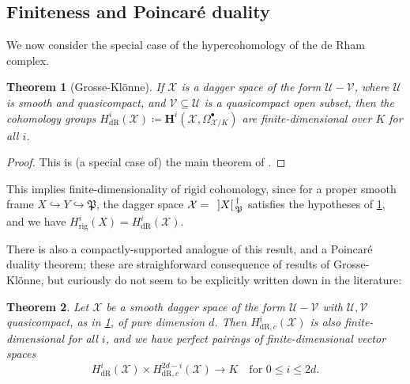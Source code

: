 \documentclass[cjm]{ipart}
\theoremstyle{plain}
\newtheorem{theorem}{Theorem}[subsection]
\theoremstyle{remark}
\DeclarePairedDelimiter{\tb}{{\,]}}{{[\, }} %
\newcommand{\HH}{\mathbf{H}}
\newcommand{\cU}{\mathcal{U}}
\newcommand{\cV}{\mathcal{V}}
\newcommand{\cX}{\mathcal{X}}
\newcommand{\dR}{\mathrm{dR}}
\newcommand{\fP}{\mathfrak{P}}
\newcommand{\into}{\hookrightarrow}
\newcommand{\rig}{\mathrm{rig}}
\numberwithin{equation}{subsection}
\renewcommand{\le}{\leqslant}
\begin{document}
 \subsection{Finiteness and Poincar\'e duality}

  We now consider the special case of the hypercohomology of the de Rham complex.


   \begin{theorem}[Grosse-Kl\"onne]
    \label{thm:GK-finiteness}
    If $\cX$ is a dagger space of the form $\cU- \cV$, where $\cU$ is smooth and quasicompact, and $\cV \subseteq \cU$ is a quasicompact open subset, then the cohomology groups $H^i_{\dR}(\cX) \coloneqq \HH^i(\cX, \Omega^\bullet_{\cX/K})$ are finite-dimensional over $K$ for all $i$.
   \end{theorem}

   \begin{proof}
    This is (a special case of) the main theorem of  \cite{grossekloenne02}.
   \end{proof}

   \begin{note}
    This implies finite-dimensionality of rigid cohomology, since for a proper smooth frame $X \into Y \into \fP$, the dagger space $\cX =\ \tb{X}^\dag_{\fP}$ satisfies the hypotheses of \cref{thm:GK-finiteness}, and we have $H^i_{\rig}(X) = H^i_{\dR}(\cX)$.
   \end{note}

   There is also a compactly-supported analogue of this result, and a Poincar\'e duality theorem; these are straighforward consequence of results of Grosse-Kl\"onne, but curiously do not seem to be explicitly written down in the literature:

   \begin{theorem}
    \label{thm:poincare}
    Let $\cX$ be a smooth dagger space of the form $\cU - \cV$ with $\cU, \cV$ quasicompact, as in \cref{thm:GK-finiteness}, of pure dimension $d$. Then $H^i_{\dR, c}(\cX)$ is also finite-dimensional for all $i$, and we have perfect pairings of finite-dimensional vector spaces
    \[ H^i_{\dR}(\cX) \times H^{2d-i}_{\dR, c}(\cX) \to K \quad \text{for $0 \le i \le 2d$}.\]
   \end{theorem}
\end{document}
